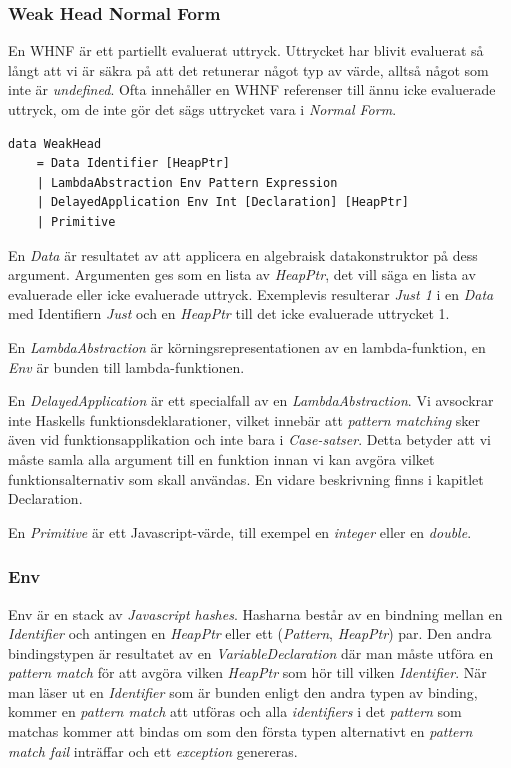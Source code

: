 \subsubsection{Weak Head Normal Form}
En WHNF är ett partiellt evaluerat uttryck. Uttrycket har blivit evaluerat så långt att vi är säkra på att det retunerar något typ av värde, alltså något som inte är \emph{undefined}. Ofta innehåller en WHNF referenser till ännu icke evaluerade uttryck, om de inte gör det sägs uttrycket vara i \emph{Normal Form}.

\begin{lstlisting}
data WeakHead 
    = Data Identifier [HeapPtr]
    | LambdaAbstraction Env Pattern Expression
    | DelayedApplication Env Int [Declaration] [HeapPtr]
    | Primitive
\end{lstlisting}

En \emph{Data} är resultatet av att applicera en algebraisk datakonstruktor på dess argument. Argumenten ges som en lista av \emph{HeapPtr}, det vill säga en lista av evaluerade eller icke evaluerade uttryck. Exemplevis resulterar \emph{Just 1} i en \emph{Data} med Identifiern \emph{Just} och en \emph{HeapPtr} till det icke evaluerade uttrycket 1.

En \emph{LambdaAbstraction} är körningsrepresentationen av en lambda-funktion, en \emph{Env} är bunden till lambda-funktionen.

En \emph{DelayedApplication} är ett specialfall av en \emph{LambdaAbstraction}. Vi avsockrar inte Haskells funktionsdeklarationer, vilket innebär att \emph{pattern matching} sker även vid funktionsapplikation och inte bara i \emph{Case-satser}. Detta betyder att vi måste samla alla argument till en funktion innan vi kan avgöra vilket funktionsalternativ som skall användas. En vidare beskrivning finns i kapitlet Declaration.

En \emph{Primitive} är ett Javascript-värde, till exempel en \emph{integer} eller en \emph{double}.

\subsubsection{Env}
Env är en stack av \emph{Javascript hashes}. Hasharna består av en bindning mellan en \emph{Identifier} och antingen en \emph{HeapPtr} eller ett (\emph{Pattern}, \emph{HeapPtr}) par.  Den andra bindingstypen är resultatet av en \emph{VariableDeclaration} där man måste utföra en \emph{pattern match} för att avgöra vilken \emph{HeapPtr} som hör till vilken \emph{Identifier}. När man läser ut en \emph{Identifier} som är bunden enligt den andra typen av binding, kommer en \emph{pattern match} att utföras och alla \emph{identifiers} i det \emph{pattern} som matchas kommer att bindas om som den första typen alternativt en \emph{pattern match fail} inträffar och ett \emph{exception} genereras.

